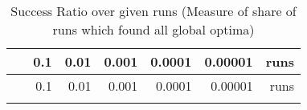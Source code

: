 \documentclass[12pt,a4paper]{article}
\begin{document}
\begin{longtable}[c]{@{}crrrrrr@{}}
\caption{Success Ratio over given runs (Measure of share of runs which
found all global optima)}\tabularnewline
\toprule
\begin{minipage}[b]{0.11\columnwidth}\centering\strut
~
\strut\end{minipage} &
\begin{minipage}[b]{0.07\columnwidth}\raggedleft\strut
0.1
\strut\end{minipage} &
\begin{minipage}[b]{0.08\columnwidth}\raggedleft\strut
0.01
\strut\end{minipage} &
\begin{minipage}[b]{0.09\columnwidth}\raggedleft\strut
0.001
\strut\end{minipage} &
\begin{minipage}[b]{0.10\columnwidth}\raggedleft\strut
0.0001
\strut\end{minipage} &
\begin{minipage}[b]{0.11\columnwidth}\raggedleft\strut
0.00001
\strut\end{minipage} &
\begin{minipage}[b]{0.07\columnwidth}\raggedleft\strut
runs
\strut\end{minipage}\tabularnewline
\midrule
\endfirsthead
\toprule
\begin{minipage}[b]{0.11\columnwidth}\centering\strut
~
\strut\end{minipage} &
\begin{minipage}[b]{0.07\columnwidth}\raggedleft\strut
0.1
\strut\end{minipage} &
\begin{minipage}[b]{0.08\columnwidth}\raggedleft\strut
0.01
\strut\end{minipage} &
\begin{minipage}[b]{0.09\columnwidth}\raggedleft\strut
0.001
\strut\end{minipage} &
\begin{minipage}[b]{0.10\columnwidth}\raggedleft\strut
0.0001
\strut\end{minipage} &
\begin{minipage}[b]{0.11\columnwidth}\raggedleft\strut
0.00001
\strut\end{minipage} &
\begin{minipage}[b]{0.07\columnwidth}\raggedleft\strut
runs
\strut\end{minipage}\tabularnewline
\midrule
\endhead
\begin{minipage}[t]{0.11\columnwidth}\centering\strut

\end{minipage}
\end{longtable}
\end{document}
